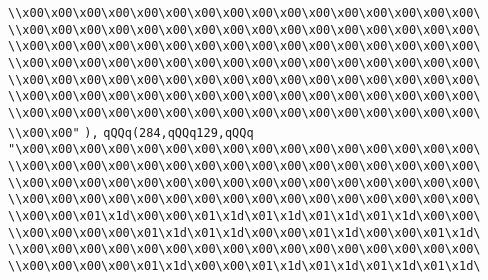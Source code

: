 \verb|\\x00\x00\x00\x00\x00\x00\x00\x00\x00\x00\x00\x00\x00\x00\x00\x00\|\newline
\verb|\\x00\x00\x00\x00\x00\x00\x00\x00\x00\x00\x00\x00\x00\x00\x00\x00\|\newline
\verb|\\x00\x00\x00\x00\x00\x00\x00\x00\x00\x00\x00\x00\x00\x00\x00\x00\|\newline
\verb|\\x00\x00\x00\x00\x00\x00\x00\x00\x00\x00\x00\x00\x00\x00\x00\x00\|\newline
\verb|\\x00\x00\x00\x00\x00\x00\x00\x00\x00\x00\x00\x00\x00\x00\x00\x00\|\newline
\verb|\\x00\x00\x00\x00\x00\x00\x00\x00\x00\x00\x00\x00\x00\x00\x00\x00\|\newline
\verb|\\x00\x00\x00\x00\x00\x00\x00\x00\x00\x00\x00\x00\x00\x00\x00\x00\|\newline
\verb|\\x00\x00"|\newline
\verb|),|\newline
\verb|qQQq(284,qQQq129,qQQq|\newline
\verb|"\x00\x00\x00\x00\x00\x00\x00\x00\x00\x00\x00\x00\x00\x00\x00\x00\|\newline
\verb|\\x00\x00\x00\x00\x00\x00\x00\x00\x00\x00\x00\x00\x00\x00\x00\x00\|\newline
\verb|\\x00\x00\x00\x00\x00\x00\x00\x00\x00\x00\x00\x00\x00\x00\x00\x00\|\newline
\verb|\\x00\x00\x00\x00\x00\x00\x00\x00\x00\x00\x00\x00\x00\x00\x00\x00\|\newline
\verb|\\x00\x00\x01\x1d\x00\x00\x01\x1d\x01\x1d\x01\x1d\x01\x1d\x00\x00\|\newline
\verb|\\x00\x00\x00\x00\x01\x1d\x01\x1d\x00\x00\x01\x1d\x00\x00\x01\x1d\|\newline
\verb|\\x00\x00\x00\x00\x00\x00\x00\x00\x00\x00\x00\x00\x00\x00\x00\x00\|\newline
\verb|\\x00\x00\x00\x00\x01\x1d\x00\x00\x01\x1d\x01\x1d\x01\x1d\x01\x1d\|\newline
